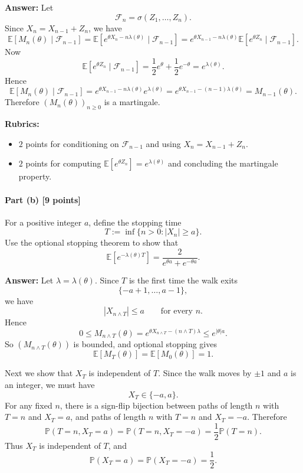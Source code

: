 \documentclass[11pt]{article}
\theoremstyle{definition}
\begin{document}
\textbf{Answer:}
Let
\[
\mathcal F_n=\sigma(Z_1,\dots,Z_n).
\]
Since \(X_n=X_{n-1}+Z_n\), we have
\[
\mathbb E[M_n(\theta)\mid \mathcal F_{n-1}]
=
\mathbb E\left[e^{\theta X_n-n\lambda(\theta)}\mid \mathcal F_{n-1}\right]
=
e^{\theta X_{n-1}-n\lambda(\theta)} \mathbb E[e^{\theta Z_n}\mid \mathcal F_{n-1}].
\]
Now
\[
\mathbb E[e^{\theta Z_n}\mid \mathcal F_{n-1}]
=
\frac12 e^\theta+\frac12 e^{-\theta}
=
e^{\lambda(\theta)}.
\]
Hence
\[
\mathbb E[M_n(\theta)\mid \mathcal F_{n-1}]
=
e^{\theta X_{n-1}-n\lambda(\theta)}e^{\lambda(\theta)}
=
e^{\theta X_{n-1}-(n-1)\lambda(\theta)}
=
M_{n-1}(\theta).
\]
Therefore \((M_n(\theta))_{n\ge 0}\) is a martingale.

\textbf{Rubrics:}
\begin{itemize}[leftmargin=2em]
    \item \(2\) points for conditioning on \(\mathcal F_{n-1}\) and using \(X_n=X_{n-1}+Z_n\).
    \item \(2\) points for computing \(\mathbb E[e^{\theta Z_n}]=e^{\lambda(\theta)}\) and concluding the martingale property.
\end{itemize}

\paragraph{Part (b) \hfill [9 points]}
For a positive integer \(a\), define the stopping time
\[
T:=\inf\{n>0:|X_n|\ge a\}.
\]
Use the optional stopping theorem to show that
\[
\mathbb E\left[e^{-\lambda(\theta)T}\right]
=
\frac{2}{e^{\theta a}+e^{-\theta a}}.
\]

\textbf{Answer:}
Let \(\lambda=\lambda(\theta)\). Since \(T\) is the first time the walk exits
\[
\{-a+1,\dots,a-1\},
\]
we have
\[
|X_{n\wedge T}|\le a
\qquad \text{for every } n.
\]
Hence
\[
0\le M_{n\wedge T}(\theta)
=
e^{\theta X_{n\wedge T}-(n\wedge T)\lambda}
\le
e^{|\theta|a}.
\]
So \((M_{n\wedge T}(\theta))\) is bounded, and optional stopping gives
\[
\mathbb E[M_T(\theta)]=\mathbb E[M_0(\theta)]=1.
\]

Next we show that \(X_T\) is independent of \(T\). Since the walk moves by \(\pm 1\) and \(a\) is an integer, we must have
\[
X_T\in\{-a,a\}.
\]
For any fixed \(n\), there is a sign-flip bijection between paths of length \(n\) with \(T=n\) and \(X_T=a\), and paths of length \(n\) with \(T=n\) and \(X_T=-a\). Therefore
\[
\mathbb P(T=n,X_T=a)=\mathbb P(T=n,X_T=-a)=\frac12 \mathbb P(T=n).
\]
Thus \(X_T\) is independent of \(T\), and
\[
\mathbb P(X_T=a)=\mathbb P(X_T=-a)=\frac12.
\]
\end{document}
